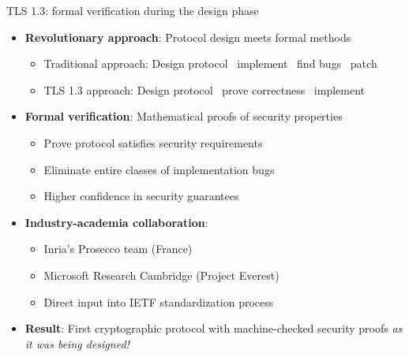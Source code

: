 \documentclass[aspectratio=169, lualatex, handout]{beamer}
\begin{document}
\begin{frame}{TLS 1.3: formal verification during the design phase}
	\begin{itemize}
		\item \textbf{Revolutionary approach}: Protocol design meets formal methods
		      \begin{itemize}
			      \item Traditional approach: Design protocol \rightarrow\ implement \rightarrow\ find bugs \rightarrow\ patch
			      \item TLS 1.3 approach: Design protocol \rightarrow\ prove correctness \rightarrow\ implement
		      \end{itemize}
		\item \textbf{Formal verification}: Mathematical proofs of security properties
		      \begin{itemize}
			      \item Prove protocol satisfies security requirements
			      \item Eliminate entire classes of implementation bugs
			      \item Higher confidence in security guarantees
		      \end{itemize}
		\item \textbf{Industry-academia collaboration}:
		      \begin{itemize}
			      \item Inria's Prosecco team (France)
			      \item Microsoft Research Cambridge (Project Everest)
			      \item Direct input into IETF standardization process
		      \end{itemize}
		\item \textbf{Result}: First cryptographic protocol with machine-checked security proofs \textit{as it was being designed!}
	\end{itemize}
\end{frame}
\end{document}
